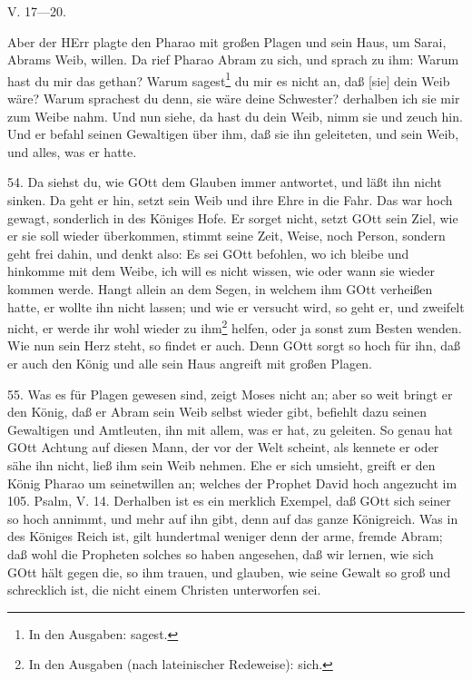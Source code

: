 \begin{schriftzitat}
V. 17—20.

Aber der HErr plagte den Pharao mit großen Plagen und sein Haus, um Sarai, Abrams Weib, willen. Da rief Pharao Abram zu sich, und sprach zu ihm: Warum hast du mir das gethan? Warum sagest\footnote{In den Ausgaben: sagest.} du mir es nicht an, daß [sie] dein Weib wäre? Warum sprachest du denn, sie wäre deine Schwester? derhalben ich sie mir zum Weibe nahm. Und nun siehe, da hast du dein Weib, nimm sie und zeuch hin. Und er befahl seinen Gewaltigen über ihm, daß sie ihn geleiteten, und sein Weib, und alles, was er hatte.
\end{schriftzitat}

54. Da siehst du, wie GOtt dem Glauben immer antwortet, und läßt ihn nicht sinken. Da geht er hin, setzt sein Weib und ihre Ehre in die Fahr. Das war hoch gewagt, sonderlich in des Königes Hofe. Er sorget nicht, setzt GOtt sein Ziel, wie er sie soll wieder überkommen, stimmt seine Zeit, Weise, noch Person, sondern geht frei dahin, und denkt also: Es sei GOtt befohlen, wo ich bleibe und hinkomme mit dem Weibe, ich will es nicht wissen, wie oder wann sie wieder kommen werde. Hangt allein an dem Segen, in welchem ihm GOtt verheißen hatte, er wollte ihn nicht lassen; und wie er versucht wird, so geht er, und zweifelt nicht, er werde ihr wohl wieder zu ihm\footnote{In den Ausgaben (nach lateinischer Redeweise): sich.} helfen, oder ja sonst zum Besten wenden. Wie nun sein Herz steht, so findet er auch. Denn GOtt sorgt so hoch für ihn, daß er auch den König und alle sein Haus angreift mit großen Plagen.

55. Was es für Plagen gewesen sind, zeigt Moses nicht an; aber so weit bringt er den König, daß er Abram sein Weib selbst wieder gibt, befiehlt dazu seinen Gewaltigen und Amtleuten, ihn mit allem, was er hat, zu geleiten. So genau hat GOtt Achtung auf diesen Mann, der vor der Welt scheint, als kennete er oder sähe ihn nicht, ließ ihm sein Weib nehmen. Ehe er sich umsieht, greift er den König Pharao um seinetwillen an; welches der Prophet David hoch angezucht im 105. Psalm, V. 14. Derhalben ist es ein merklich Exempel, daß GOtt sich seiner so hoch annimmt, und mehr auf ihn gibt, denn auf das ganze Königreich. Was in des Königes Reich ist, gilt hundertmal weniger denn der arme, fremde Abram; daß wohl die Propheten solches so haben angesehen, daß wir lernen, wie sich GOtt hält gegen die, so ihm trauen, und glauben, wie seine Gewalt so groß und schrecklich ist, die nicht einem Christen unterworfen sei.

